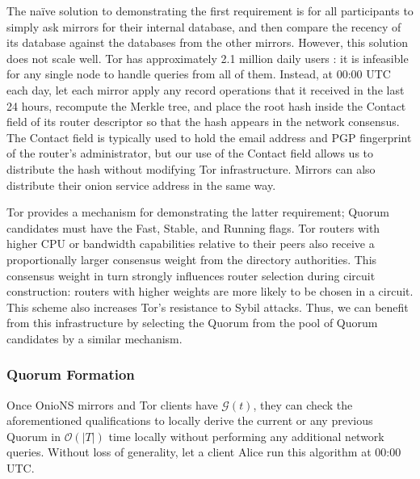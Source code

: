 \documentclass[USenglish,oneside,twocolumn]{article}
\begin{document}
The na\"{i}ve solution to demonstrating the first requirement is for all participants to simply ask mirrors for their internal database, and then compare the recency of its database against the databases from the other mirrors. However, this solution does not scale well. Tor has approximately 2.1 million daily users \cite{TorMetrics}: it is infeasible for any single node to handle queries from all of them. Instead, at 00:00 UTC each day, let each mirror apply any record operations that it received in the last 24 hours, recompute the Merkle tree, and place the root hash inside the Contact field of its router descriptor so that the hash appears in the network consensus. The Contact field is typically used to hold the email address and PGP fingerprint of the router's administrator, but our use of the Contact field allows us to distribute the hash without modifying Tor infrastructure. Mirrors can also distribute their onion service address in the same way. %

Tor provides a mechanism for demonstrating the latter requirement; Quorum candidates must have the Fast, Stable, and Running flags. Tor routers with higher CPU or bandwidth capabilities relative to their peers also receive a proportionally larger consensus weight from the directory authorities. This consensus weight in turn strongly influences router selection during circuit construction: routers with higher weights are more likely to be chosen in a circuit. This scheme also increases Tor's resistance to Sybil attacks. Thus, we can benefit from this infrastructure by selecting the Quorum from the pool of Quorum candidates by a similar mechanism.

\subsubsection{Quorum Formation}
\label{sec:qFormation}

Once OnioNS mirrors and Tor clients have $ \mathcal{G}(t) $, they can check the aforementioned qualifications to locally derive the current or any previous Quorum in $ \mathcal{O}(\left\vert{T}\right\vert) $ time locally without performing any additional network queries. Without loss of generality, let a client Alice run this algorithm at 00:00 UTC.
\end{document}
